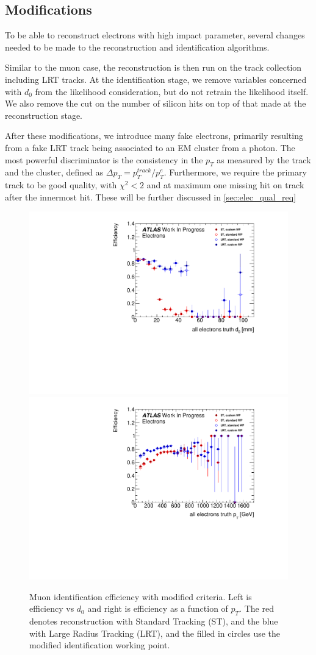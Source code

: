 \subsection{Modifications}
To be able to reconstruct electrons with high impact parameter, several changes needed to be made to the reconstruction and identification algorithms. 

Similar to the muon case, the reconstruction is then run on the track collection including \ac{LRT} tracks. At the identification stage, we remove variables concerned with $d_{0}$ from the likelihood consideration, but do not retrain the likelihood itself. We also remove the cut on the number of silicon hits on top of that made at the reconstruction stage. 

After these modifications, we introduce many fake electrons, primarily resulting from a fake \ac{LRT} track being associated to an \ac{EM} cluster from a photon. The most powerful discriminator is the consistency in the $p_{T}$ as measured by the track and the cluster, defined as $\Delta p_{T} = p_{T}^{track}/p_{T}^{e}$. Furthermore, we require the primary track to be good quality, with $\chi^{2} < 2$ and at maximum one missing hit on track after the innermost hit. These will be further discussed in \autoref{sec:elec_qual_req}

\begin{figure}[htbp]
\centering
\includegraphics[width=.48\textwidth]{figures/EventReconstruction/wp_e_d0_all_wip.pdf}
\includegraphics[width=.48\textwidth]{figures/EventReconstruction/wp_e_pt_all_wip.pdf}
\caption{Muon identification efficiency with modified criteria. Left is efficiency vs $d_{0}$ and right is efficiency as a function of $p_{T}$. The red denotes reconstruction with Standard Tracking (ST), and the blue with Large Radius Tracking (LRT), and the filled in circles use the modified identification working point. }
\label{fig:cust_elec_eff}
\end{figure}




